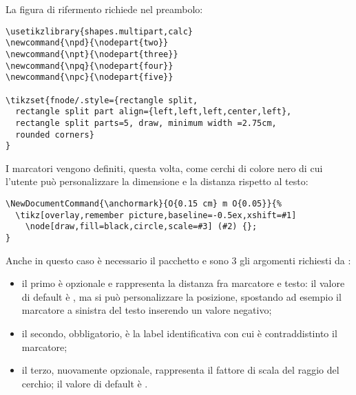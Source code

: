 La figura di rifermento richiede nel preambolo:
\begin{lstlisting}[frame=lines]
\usetikzlibrary{shapes.multipart,calc}
\newcommand{\npd}{\nodepart{two}}
\newcommand{\npt}{\nodepart{three}}
\newcommand{\npq}{\nodepart{four}}
\newcommand{\npc}{\nodepart{five}}

\tikzset{fnode/.style={rectangle split, 
  rectangle split part align={left,left,left,center,left}, 
  rectangle split parts=5, draw, minimum width =2.75cm,
  rounded corners}
}
\end{lstlisting}
I marcatori vengono definiti, questa volta, come cerchi di colore nero di cui l'utente può personalizzare la dimensione e la distanza rispetto al testo:
\begin{lstlisting}[frame=lines]
\NewDocumentCommand{\anchormark}{O{0.15 cm} m O{0.05}}{%
  \tikz[overlay,remember picture,baseline=-0.5ex,xshift=#1] 
    \node[draw,fill=black,circle,scale=#3] (#2) {};
}
\end{lstlisting}
Anche in questo caso è necessario il pacchetto  e sono 3 gli argomenti richiesti da :
\begin{itemize}
\item il primo è opzionale e rappresenta la distanza fra marcatore e testo: il valore di default è \chiavestyle{0.15cm}, ma si può personalizzare la posizione, spostando ad esempio il marcatore a sinistra del testo inserendo un valore negativo;
\item il secondo, obbligatorio, è la label identificativa con cui è contraddistinto il marcatore;
\item il terzo, nuovamente opzionale, rappresenta il fattore di scala del raggio del cerchio; il valore di default è .
\end{itemize}


